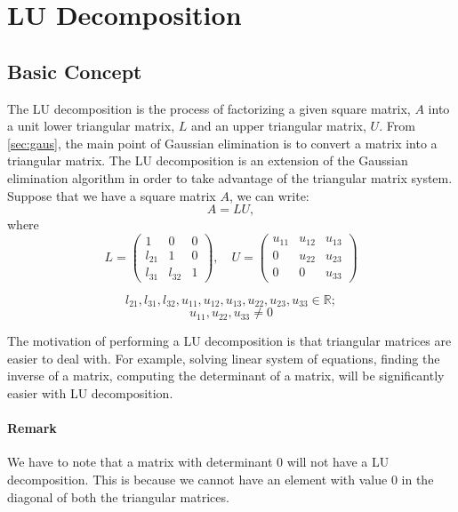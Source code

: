 \documentclass[12pt,reqno,twoside,titlepage]{article}
\theoremstyle{definition}
\begin{document}
\newpage
\section{LU Decomposition}
\label{sec:LUD}
\subsection{Basic Concept}
\label{subsec:LUD:BAC}
The LU decomposition is the process of factorizing a given square matrix, $A$ into a unit lower triangular matrix, $L$ and an upper triangular matrix, $U$.
From \ref{sec:gaus}, the main point of Gaussian elimination is to convert a matrix into a triangular matrix.
The LU decomposition is an extension of the Gaussian elimination algorithm in order to take advantage of the triangular matrix system.
\newline
Suppose that we have a square matrix $A$, we can write:
$$A = LU,$$ 
where
\begin{equation*}
  L=\begin{pmatrix}
    1 & 0 & 0 \\
    l_{21} & 1 & 0 \\
    l_{31} & l_{32} & 1
  \end{pmatrix}
  ,
  \quad
  U=\begin{pmatrix}
    u_{11} & u_{12} & u_{13}\\
    0 & u_{22} & u_{23}\\
    0 & 0 & u_{33}
  \end{pmatrix}
\end{equation*}
\begin{center}
  \begin{equation*}
    l_{21}, l_{31}, l_{32}, u_{11}, u_{12}, u_{13}, u_{22}, u_{23}, u_{33} \in \mathbb{R};
  \end{equation*}
  \begin{equation*}
    u_{11}, u_{22}, u_{33} \neq 0
  \end{equation*}
\end{center}
The motivation of performing a LU decomposition is that triangular matrices are easier to deal with.
For example, solving linear system of equations, finding the inverse of a matrix, computing the determinant of a matrix, will be significantly easier with LU decomposition.
\paragraph{Remark}
We have to note that a matrix with determinant $0$ will not have a LU decomposition.
This is because we cannot have an element with value $0$ in the diagonal of both the triangular matrices.
\end{document}
